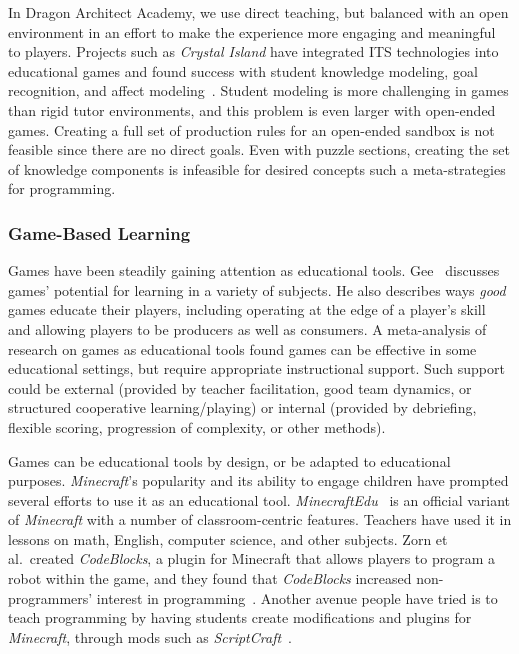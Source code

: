 \documentclass{sig-alternate}
\newcommand{\gametitle}{{\color{RoyalPurple} Dragon Architect Academy}}
\begin{document}
In \gametitle{}, we use direct teaching, but balanced with an open environment in an effort to make the experience more engaging and meaningful to players.
Projects such as \emph{Crystal Island} have integrated ITS technologies into educational games and found success with student knowledge modeling, goal recognition, and affect modeling~\cite{lester2013serious,rowe2010modeling}.
Student modeling is more challenging in games than rigid tutor environments, and this problem is even larger with open-ended games.
Creating a full set of production rules for an open-ended sandbox is not feasible since there are no direct goals.
Even with puzzle sections, creating the set of knowledge components is infeasible for desired concepts such a meta-strategies for programming.

\subsubsection{Game-Based Learning}
Games have been steadily gaining attention as educational tools. 
Gee~\cite{gee2003video} discusses games' potential for learning in a variety of subjects. 
He also describes ways \emph{good} games educate their players, including operating at the edge of a player's skill and allowing players to be producers as well as consumers. 
A meta-analysis of research on games as educational tools \cite{ke2009qualitative} found games can be effective in some educational settings, but require appropriate instructional support.
Such support could be external (provided by teacher facilitation, good team dynamics, or structured cooperative learning/playing) or internal (provided by debriefing, flexible scoring, progression of complexity, or other methods).

Games can be educational tools by design, or be adapted to educational purposes. 
\emph{Minecraft}'s popularity and its ability to engage children have prompted several efforts to use it as an educational tool.
\emph{MinecraftEdu}~\cite{minecraftedu} is an official variant of \emph{Minecraft} with a number of classroom-centric features. 
Teachers have used it in lessons on math, English, computer science, and other subjects.  
Zorn et al.\ created \emph{CodeBlocks}, a plugin for Minecraft that allows players to program a robot within the game, and they found that \emph{CodeBlocks} increased non-programmers' interest in programming~\cite{zorn2013minecraft}.
Another avenue people have tried is to teach programming by having students create modifications and plugins for \emph{Minecraft}, through mods such as \emph{ScriptCraft}~\cite{scriptcraft}.
\end{document}
